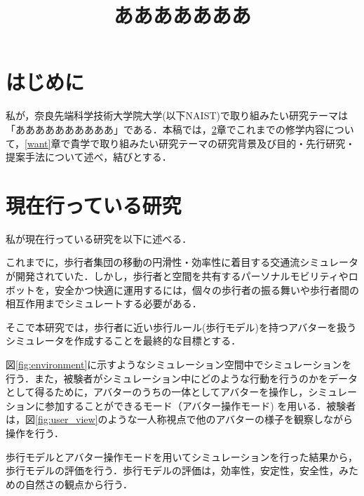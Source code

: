 \documentclass[twocolumn]{jarticle}%
\title{\vspace{5mm}\large{あああああああ}\vspace{-15mm}}
\date{}
\begin{document}
\normalsize
\maketitle

\section{はじめに}
\thispagestyle{fancy}

私が，奈良先端科学技術大学院大学(以下NAIST)で取り組みたい研究テーマは「ああああああああああ」である．本稿では，\ref{current}章でこれまでの修学内容について，\ref{want}章で貴学で取り組みたい研究テーマの研究背景及び目的・先行研究・提案手法について述べ，結びとする．

\section{現在行っている研究}\label{current}
私が現在行っている研究を以下に述べる．

これまでに，歩行者集団の移動の円滑性・効率性に着目する交通流シミュレータが開発されていた．しかし，歩行者と空間を共有するパーソナルモビリティやロボットを，安全かつ快適に運用するには，個々の歩行者の振る舞いや歩行者間の相互作用までシミュレートする必要がある．

そこで本研究では，歩行者に近い歩行ルール(歩行モデル)を持つアバターを扱うシミュレータを作成することを最終的な目標とする．

図\ref{fig:environment}に示すようなシミュレーション空間中でシミュレーションを行う．また，被験者がシミュレーション中にどのような行動を行うのかをデータとして得るために，アバターのうちの一体としてアバターを操作し，シミュレーションに参加することができるモード（アバター操作モード) を用いる．被験者は，図\ref{fig:user_view}のような一人称視点で他のアバターの様子を観察しながら操作を行う．

歩行モデルとアバター操作モードを用いてシミュレーションを行った結果から，歩行モデルの評価を行う．歩行モデルの評価は，効率性，安定性，安全性，みための自然さの観点から行う．
\end{document}
